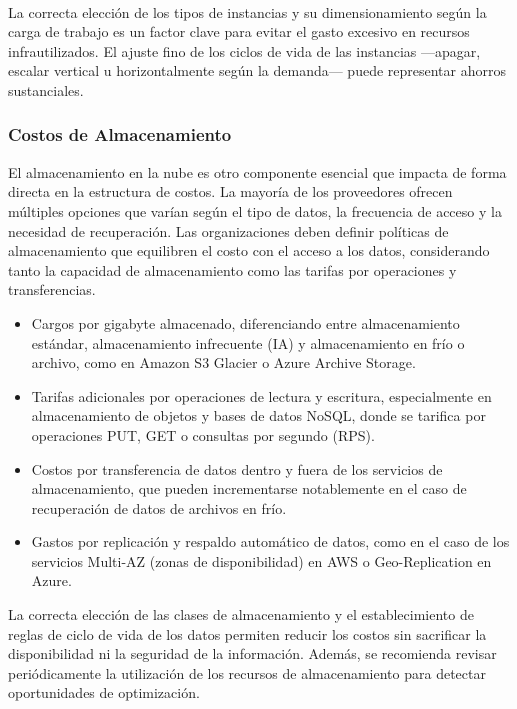 {                \paragraph{} La correcta elección de los tipos de instancias y su dimensionamiento según la carga de trabajo es un factor clave para evitar el gasto excesivo en recursos infrautilizados. El ajuste fino de los ciclos de vida de las instancias —apagar, escalar vertical u horizontalmente según la demanda— puede representar ahorros sustanciales.
                
            \subsubsection{Costos de Almacenamiento}
                El almacenamiento en la nube es otro componente esencial que impacta de forma directa en la estructura de costos. La mayoría de los proveedores ofrecen múltiples opciones que varían según el tipo de datos, la frecuencia de acceso y la necesidad de recuperación. Las organizaciones deben definir políticas de almacenamiento que equilibren el costo con el acceso a los datos, considerando tanto la capacidad de almacenamiento como las tarifas por operaciones y transferencias.
                
                \begin{itemize}
                    \item Cargos por gigabyte almacenado, diferenciando entre almacenamiento estándar, almacenamiento infrecuente (IA) y almacenamiento en frío o archivo, como en Amazon S3 Glacier o Azure Archive Storage.
                    \item Tarifas adicionales por operaciones de lectura y escritura, especialmente en almacenamiento de objetos y bases de datos NoSQL, donde se tarifica por operaciones PUT, GET o consultas por segundo (RPS).
                    \item Costos por transferencia de datos dentro y fuera de los servicios de almacenamiento, que pueden incrementarse notablemente en el caso de recuperación de datos de archivos en frío.
                    \item Gastos por replicación y respaldo automático de datos, como en el caso de los servicios Multi-AZ (zonas de disponibilidad) en AWS o Geo-Replication en Azure.
                \end{itemize}
                
                La correcta elección de las clases de almacenamiento y el establecimiento de reglas de ciclo de vida de los datos permiten reducir los costos sin sacrificar la disponibilidad ni la seguridad de la información. Además, se recomienda revisar periódicamente la utilización de los recursos de almacenamiento para detectar oportunidades de optimización.
                
}
